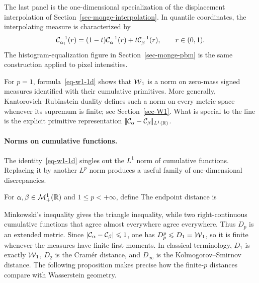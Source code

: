 The last panel is the one-dimensional specialization of the displacement interpolation of Section~\ref{sec-monge-interpolation}. In quantile coordinates, the interpolating measure is characterized by
\[
	\mathcal{C}_{\alpha_t}^{-1}(r)
	=
	(1-t)\mathcal{C}_{\alpha}^{-1}(r)+t\mathcal{C}_{\beta}^{-1}(r),
	\qquad r\in(0,1).
\]
The histogram-equalization figure in Section~\ref{sec-monge-pbm} is the same construction applied to pixel intensities.

\begin{rem}\label{rem-w1-norm-1d}
	For $p=1$, formula~\eqref{eq-w1-1d} shows that $\operatorname{\mathcal{W}}_1$ is a norm on zero-mass signed measures identified with their cumulative primitives. More generally, Kantorovich--Rubinstein duality defines such a norm on every metric space whenever its supremum is finite; see Section~\ref{sec-W1}. What is special to the line is the explicit primitive representation $|\!| \mathcal{C}_{\alpha}-\mathcal{C}_{\beta} |\!|_{L^1(\mathbb{R})}$.
\end{rem}

\paragraph{Norms on cumulative functions.}
The identity~\eqref{eq-w1-1d} singles out the $L^1$ norm of cumulative functions. Replacing it by another $L^p$ norm produces a useful family of one-dimensional discrepancies.

\begin{defn}\label{def-cumulative-function-distance}
	For $\alpha,\beta\in\mathcal{M}_+^1(\mathbb{R})$ and $1\leq p<+\infty$, define
	The endpoint distance is
\end{defn}

Minkowski's inequality gives the triangle inequality, while two right-continuous cumulative functions that agree almost everywhere agree everywhere. Thus $D_p$ is an extended metric. Since $\left\lvert\mathcal{C}_{\alpha}-\mathcal{C}_{\beta}\right\rvert\leqslant1$, one has $D_p^p\leqslant D_1=\operatorname{\mathcal{W}}_1$, so it is finite whenever the measures have finite first moments. In classical terminology, $D_1$ is exactly $\operatorname{\mathcal{W}}_1$, $D_2$ is the Cram\'er distance, and $D_\infty$ is the Kolmogorov--Smirnov distance. The following proposition makes precise how the finite-$p$ distances compare with Wasserstein geometry.

